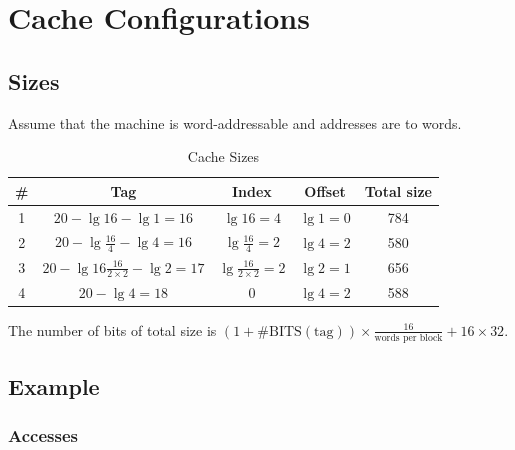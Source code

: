 \documentclass[12pt, a4paper]{article}
\begin{document}
\section{Cache Configurations}

\subsection{Sizes}

Assume that the machine is word-addressable and addresses are to words.

\begin{table}[hbp]
\caption{Cache Sizes}
\label{tab:cache_size}
\centering
\begin{tabular}{ccccc}
\# & Tag & Index & Offset & Total size \\
\hline
1 & $20-\lg16-\lg1=16$ & $\lg16=4$ & $\lg1=0$ & 784 \\
2 & $20-\lg\frac{16}{4}-\lg4=16$ & $\lg\frac{16}{4}=2$ & $\lg4=2$ & 580 \\
3 & $20-\lg16\frac{16}{2\times2}-\lg2=17$ & $\lg\frac{16}{2\times2}=2$ & $\lg2=1$ & 656 \\
4 & $20-\lg4=18$ & 0 & $\lg4=2$ & 588
\end{tabular}
\end{table}

The number of bits of total size is $(1+\#\text{BITS}(\text{tag}))\times\frac{16}{\text{words per block}}+16\times32$.

\subsection{Example}

\subsubsection{Accesses}
\end{document}
